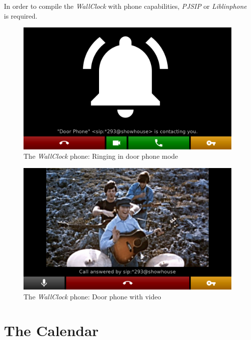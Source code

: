 \documentclass[12pt,english,parskip=half,headheight=19pt]{scrreprt}
\begin{document}
In order to compile the \textit{WallClock} with phone capabilities,
\textit{PJSIP} or \textit{Liblinphone} is required.

\begin{figure}[ht]
  \centering
  \includegraphics[width=0.7\linewidth]{figs/wallclock-doorman-1.png}
  \caption[l]{The \textit{WallClock} phone: Ringing in door phone mode}
  \label{fig:wallclock-phone-1}
\end{figure}

\begin{figure}[ht]
  \centering
  \includegraphics[width=0.7\linewidth]{figs/wallclock-doorman-2.png}
  \caption[l]{
    The \textit{WallClock} phone: Door phone with video\footnotemark[1]
  }
  \label{fig:wallclock-phone-2}
\end{figure}




\section{The Calendar}
\label{sec:wallclock-calendar}
\end{document}
